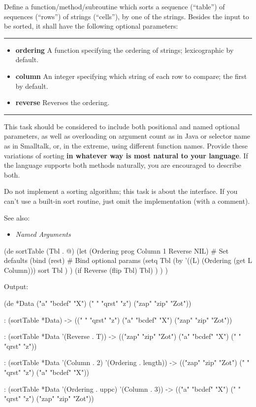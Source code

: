 Define a function/method/subroutine which sorts a sequence (``table'')
of sequences (``rows'') of strings (``cells''), by one of the strings.
Besides the input to be sorted, it shall have the following optional
parameters:

\begin{center}\rule{3in}{0.4pt}\end{center}

\begin{itemize}
\item \textbf{ordering} A function specifying the ordering of strings;
  lexicographic by default.
\item \textbf{column} An integer specifying which string of each row
  to compare; the first by default.
\item \textbf{reverse} Reverses the ordering.
\end{itemize}

\begin{center}\rule{3in}{0.4pt}\end{center}

This task should be considered to include both positional and named
optional parameters, as well as overloading on argument count as in Java
or selector name as in Smalltalk, or, in the extreme, using different
function names. Provide these variations of sorting \textbf{in whatever
way is most natural to your language}. If the language supports both
methods naturally, you are encouraged to describe both.

Do not implement a sorting algorithm; this task is about the interface.
If you can't use a built-in sort routine, just omit the implementation
(with a comment).

See also:

\begin{itemize}
\item
  \emph{Named Arguments}
\end{itemize}



\begin{wideverbatim}

(de sortTable (Tbl . @)
   (let (Ordering prog  Column 1  Reverse NIL)  # Set defaults
      (bind (rest)                              # Bind optional params
         (setq Tbl
            (by '((L) (Ordering (get L Column)))
               sort
               Tbl ) )
         (if Reverse (flip Tbl) Tbl) ) ) )

Output:

(de *Data ("a" "bcdef" "X") (" " "qrst" "z") ("zap" "zip" "Zot"))

: (sortTable *Data)
-> ((" " "qrst" "z") ("a" "bcdef" "X") ("zap" "zip" "Zot"))

: (sortTable *Data '(Reverse . T))
-> (("zap" "zip" "Zot") ("a" "bcdef" "X") (" " "qrst" "z"))

: (sortTable *Data '(Column . 2) '(Ordering . length))
-> (("zap" "zip" "Zot") (" " "qrst" "z") ("a" "bcdef" "X"))

: (sortTable *Data '(Ordering . uppc) '(Column . 3))
-> (("a" "bcdef" "X") (" " "qrst" "z") ("zap" "zip" "Zot"))

\end{wideverbatim}

